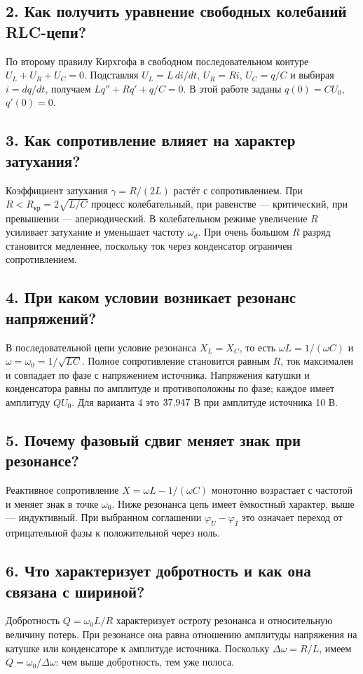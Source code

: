 \documentclass[12pt,a4paper]{article}
\begin{document}
\subsection*{2. Как получить уравнение свободных колебаний RLC-цепи?}
По второму правилу Кирхгофа в свободном последовательном контуре
$U_L+U_R+U_C=0$. Подставляя $U_L=L\,di/dt$, $U_R=Ri$,
$U_C=q/C$ и выбирая $i=dq/dt$, получаем
$Lq''+Rq'+q/C=0$. В этой работе заданы $q(0)=CU_0$, $q'(0)=0$.

\subsection*{3. Как сопротивление влияет на характер затухания?}
Коэффициент затухания $\gamma=R/(2L)$ растёт с сопротивлением.
При $R<R_{\mathrm{кр}}=2\sqrt{L/C}$ процесс колебательный,
при равенстве --- критический, при превышении --- апериодический.
В колебательном режиме увеличение $R$ усиливает затухание и уменьшает
частоту $\omega_d$. При очень большом $R$ разряд становится медленнее,
поскольку ток через конденсатор ограничен сопротивлением.

\subsection*{4. При каком условии возникает резонанс напряжений?}
В последовательной цепи условие резонанса $X_L=X_C$, то есть
$\omega L=1/(\omega C)$ и $\omega=\omega_0=1/\sqrt{LC}$.
Полное сопротивление становится равным $R$, ток максимален и совпадает
по фазе с напряжением источника. Напряжения катушки и конденсатора равны
по амплитуде и противоположны по фазе; каждое имеет амплитуду $QU_0$.
Для варианта 4 это $37{,}947$ В при амплитуде источника 10 В.

\subsection*{5. Почему фазовый сдвиг меняет знак при резонансе?}
Реактивное сопротивление $X=\omega L-1/(\omega C)$ монотонно
возрастает с частотой и меняет знак в точке $\omega_0$.
Ниже резонанса цепь имеет ёмкостный характер, выше --- индуктивный.
При выбранном соглашении $\varphi_U-\varphi_I$ это означает переход
от отрицательной фазы к положительной через ноль.

\subsection*{6. Что характеризует добротность и как она связана с шириной?}
Добротность $Q=\omega_0L/R$ характеризует остроту резонанса
и относительную величину потерь. При резонансе она равна отношению
амплитуды напряжения на катушке или конденсаторе к амплитуде источника.
Поскольку $\Delta\omega=R/L$, имеем $Q=\omega_0/\Delta\omega$:
чем выше добротность, тем уже полоса.
\end{document}
